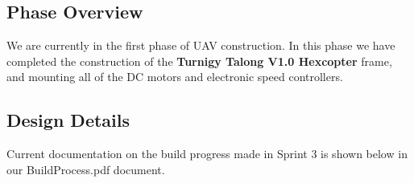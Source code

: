 \subsection{Phase Overview}
We are currently in the first phase of UAV construction. In this phase we have completed the construction of the \textbf{Turnigy Talong V1.0 Hexcopter} frame, and mounting all of the DC motors and electronic speed controllers.
\subsection{Design Details}
Current documentation on the build progress made in Sprint 3 is shown below in our BuildProcess.pdf document.



 
% 
% 
% 
% 
